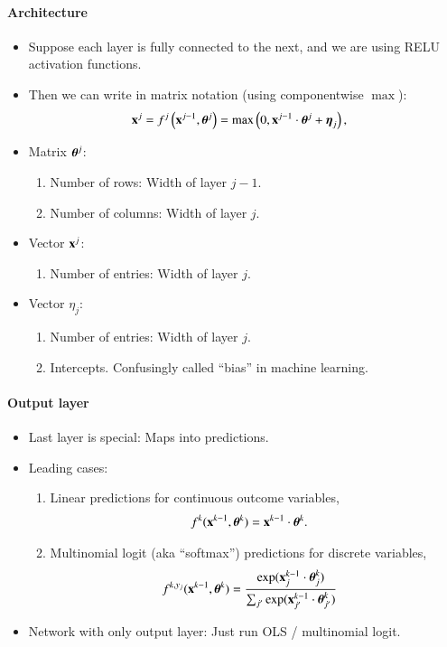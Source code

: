 \documentclass[notes, ignorenonframetext, compress, 10pt, xcolor=svgnames, aspectratio=169]{beamer}
\begin{document}
  \begin{frame}{\insertsection}
    \framesubtitle{Architecture}
  \begin{itemize}
    \item Suppose each layer is fully connected to the next, and we are using RELU
    activation functions.
    \item Then we can write in matrix notation (using componentwise $\max$):
    \begin{align*}
      {\mathbf x}^j &= f^j\left({\mathbf x}^{j-1}, {\boldsymbol \theta}^j\right) = \max\left(0, {\mathbf x}^{j-1}\cdot{\boldsymbol \theta}^j+{\boldsymbol \eta}_j\right),
    \end{align*}
  \item Matrix ${\boldsymbol \theta}^j$:
  \begin{enumerate}[$\cdot$]
  \item Number of rows: Width of layer $j-1$.
  \item Number of columns: Width of layer $j$.
  \end{enumerate}
  \item Vector ${\mathbf x}^j$:
  \begin{enumerate}[$\cdot$]
  \item Number of entries: Width of layer $j$.
  \end{enumerate}
  \item Vector $\eta_j$:
  \begin{enumerate}[$\cdot$]
  \item Number of entries: Width of layer $j$.
  \item Intercepts. Confusingly called “bias” in machine learning.
\end{enumerate}
  \end{itemize}
\end{frame}

\begin{frame}[allowframebreaks]{\insertsection}
\framesubtitle{Output layer}
\begin{itemize}
\item Last layer is special: Maps into predictions.
\item Leading cases:
\begin{enumerate}
\item Linear predictions for continuous outcome variables,
\begin{align*}
  f^k({\mathbf x}^{k-1},{\boldsymbol \theta}^k) &={\mathbf x}^{k-1}\cdot{\boldsymbol \theta}^k.
\end{align*}
\item Multinomial logit (aka “softmax”) predictions for discrete variables,
\begin{align*}
f^{k, y_j}({\mathbf x}^{k-1},{\boldsymbol \theta}^k)  &=\frac{\exp({\mathbf x}^{k-1}_j\cdot{\boldsymbol \theta}^k_j)}
{\sum_{j^\prime} \exp({\mathbf x}^{k-1}_{j^\prime}\cdot{\boldsymbol \theta}^k_{j^\prime})}
\end{align*}
\end{enumerate}
\item Network with only output layer: Just run OLS / multinomial logit.
\end{itemize}
\end{frame}
\end{document}

